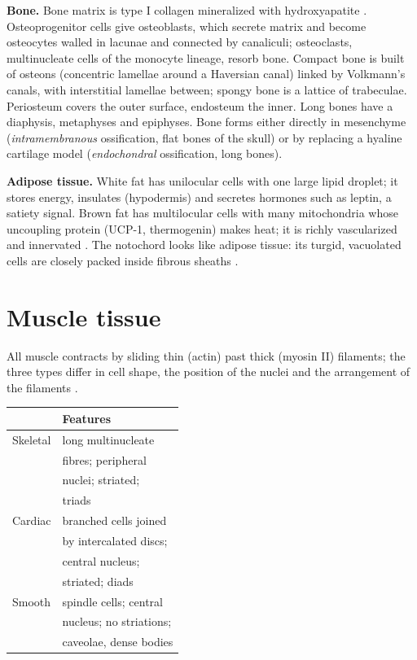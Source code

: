 \textbf{Bone.} Bone matrix is type I collagen
mineralized with hydroxyapatite \cite[Chapter
8]{ross2011histology}. Osteoprogenitor cells
give osteoblasts, which secrete matrix and
become osteocytes walled in lacunae and
connected by canaliculi; osteoclasts,
multinucleate cells of the monocyte lineage,
resorb bone. Compact bone is built of osteons
(concentric lamellae around a Haversian
canal) linked by Volkmann's canals, with
interstitial lamellae between; spongy bone is
a lattice of trabeculae. Periosteum covers
the outer surface, endosteum the inner. Long
bones have a diaphysis, metaphyses and
epiphyses. Bone forms either directly in
mesenchyme (\emph{intramembranous}
ossification, flat bones of the skull) or by
replacing a hyaline cartilage model
(\emph{endochondral} ossification, long
bones).

\textbf{Adipose tissue.} White fat has
unilocular cells with one large lipid
droplet; it stores energy, insulates
(hypodermis) and secretes hormones such as
leptin, a satiety signal. Brown fat has
multilocular cells with many mitochondria
whose uncoupling protein (UCP-1, thermogenin)
makes heat; it is richly vascularized and
innervated \cite[Chapter
9]{ross2011histology}. The
notochord looks like adipose tissue: its
turgid, vacuolated cells are closely packed
inside fibrous sheaths \cite[Chapter
15]{hickman2002animal}.

\section{Muscle tissue}
\label{section-muscle}

All muscle contracts by sliding thin (actin)
past thick (myosin II) filaments; the three
types differ in cell shape, the position of
the nuclei and the arrangement of the
filaments \cite[Chapter
11]{ross2011histology}.

\begin{center}
\begin{tabular}{ll}
& Features \\
\hline
Skeletal & long multinucleate \\
& fibres; peripheral \\
& nuclei; striated; \\
& triads \\
Cardiac & branched cells joined \\
& by intercalated discs; \\
& central nucleus; \\
& striated; diads \\
Smooth & spindle cells; central \\
& nucleus; no striations; \\
& caveolae, dense bodies \\
\end{tabular}
\end{center}

